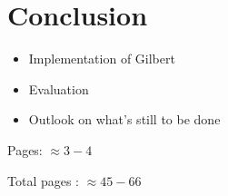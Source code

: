 \chapter{Conclusion}
\label{cha:conclusion}

\begin{itemize}
	\item Implementation of Gilbert
	\item Evaluation
	\item Outlook on what's still to be done
\end{itemize}

Pages: $\approx 3-4$

Total pages : $\approx 45 - 66$